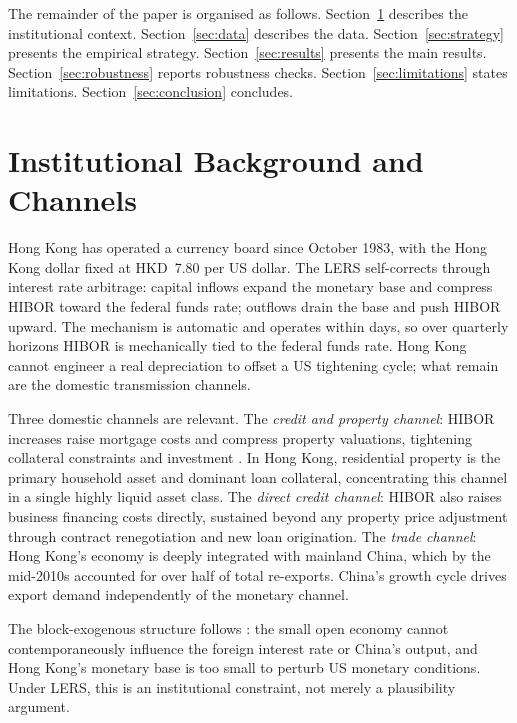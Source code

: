 \documentclass[12pt,a4paper]{article}
\begin{document}
The remainder of the paper is organised as follows. Section~\ref{sec:background}
describes the institutional context. Section~\ref{sec:data} describes the data.
Section~\ref{sec:strategy} presents the empirical strategy. Section~\ref{sec:results}
presents the main results. Section~\ref{sec:robustness} reports robustness checks.
Section~\ref{sec:limitations} states limitations. Section~\ref{sec:conclusion} concludes.

\section{Institutional Background and Channels}
\label{sec:background}

Hong Kong has operated a currency board since October 1983, with the Hong Kong
dollar fixed at HKD~7.80 per US dollar. The LERS self-corrects through interest
rate arbitrage: capital inflows expand the monetary base and compress HIBOR toward
the federal funds rate; outflows drain the base and push HIBOR upward. The
mechanism is automatic and operates within days, so over quarterly horizons HIBOR
is mechanically tied to the federal funds rate. Hong Kong cannot engineer a real
depreciation to offset a US tightening cycle; what remain are the domestic
transmission channels.

Three domestic channels are relevant. The \emph{credit and property channel}:
HIBOR increases raise mortgage costs and compress property valuations, tightening
collateral constraints and investment \citep{BernankeBlinder1992,GoodhartHofmann2008}.
In Hong Kong, residential property is the primary household asset and dominant
loan collateral, concentrating this channel in a single highly liquid asset class.
The \emph{direct credit channel}: HIBOR also raises business financing costs
directly, sustained beyond any property price adjustment through contract
renegotiation and new loan origination. The \emph{trade channel}: Hong Kong's
economy is deeply integrated with mainland China, which by the mid-2010s accounted
for over half of total re-exports. China's growth cycle drives export demand
independently of the monetary channel.

The block-exogenous structure follows \citet{CushmanZha1997}: the small open
economy cannot contemporaneously influence the foreign interest rate or China's
output, and Hong Kong's monetary base is too small to perturb US monetary
conditions. Under LERS, this is an institutional constraint, not merely a
plausibility argument.
\end{document}
